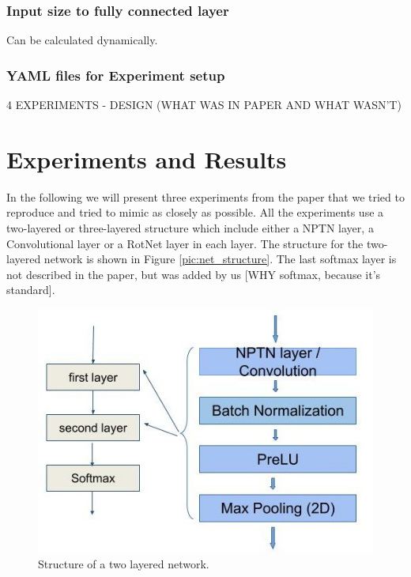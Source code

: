 \documentclass{llncs}
\begin{document}

\subsubsection{Input size to fully connected layer}
Can be calculated dynamically.
\subsubsection{YAML files for Experiment setup}

4 EXPERIMENTS
- DESIGN (WHAT WAS IN PAPER AND WHAT WASN'T)



\section{Experiments and Results}	
In the following we will present three experiments from the paper that we tried to reproduce and tried to mimic as closely as possible. 
All the experiments use a two-layered or three-layered structure which include either a NPTN layer, a Convolutional layer or a RotNet layer in each layer. The structure for the two-layered network is shown in Figure \ref{pic:net_structure}. The last softmax layer is not described in the paper, but was added by us [WHY softmax, because it's standard]. 

\begin{figure}
	\begin{center}
	\includegraphics[scale=0.35]{result_images/network_structure.jpg}
	\caption{Structure of a two layered network.}
	\label{pic:network_structure}
	\end{center}
\end{figure}
\end{document}
